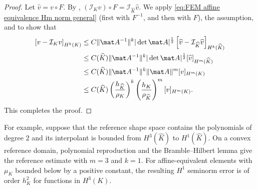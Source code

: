 \begin{proof}
    Let $\widehat v = v \circ F$. By , $(\mathcal I_{K} v) \circ F = \mathcal I_{\widehat K} \widehat v$.
    We apply \eqref{eq:FEM affine equivalence Hm norm general} (first with $F^{-1}$, and then with $F$), the assumption, and  to show that
    \begin{align*}
        \left[v - \mathcal I_{K} v \right]_{H^k(K)}
         & \le C \|\mat A^{-1}\|^k |\det \mat A|^{\frac 1 2} \left[\widehat v - \mathcal I_{\widehat K} \widehat v \right]_{H^k(\widehat K)}
        \\
         & \le C(\widehat K) \|\mat A^{-1}\|^k |\det \mat A|^{\frac 1 2} [\widehat v]_{H^m(\widehat K)}
        \\
         & \le C(\widehat K) \|\mat A^{-1}\|^k \|\mat A\|^m  [v]_{H^m(K)}
        \\
         & \le C(\widehat K) \left( \frac{h_{\widehat K}}{\rho_{K}} \right)^k \left( \frac{h_{K}}{\rho_{\widehat K}} \right)^m  [v]_{H^m(K)}.
    \end{align*}
    This completes the proof.
\end{proof}
For example, suppose that the reference shape space contains the polynomials of degree $2$ and its interpolant is bounded from $H^3(\widehat K)$ to $H^1(\widehat K)$. On a convex reference domain, polynomial reproduction and the Bramble--Hilbert lemma give the reference estimate with $m = 3$ and $k = 1$. For affine-equivalent elements with $\mu_K$ bounded below by a positive constant, the resulting $H^1$ seminorm error is of order $h_K^2$ for functions in $H^3(K)$.

